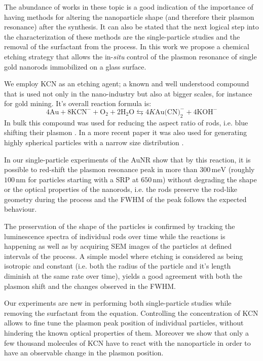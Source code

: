 \documentclass{article}
\begin{document}
The abundance of works in these topic is a good indication of the importance of
having methods for altering the nanoparticle shape (and therefore their plasmon
resonance) after the synthesis. It can also be stated that the next logical step
into the characterization of these methods are the single-particle studies and
the removal of the surfactant from the process. In this work we propose a
chemical etching strategy that allows the in-\textit{situ} control of the
plasmon resonance of single gold nanorods immobilized on a glass surface.

We employ KCN as an etching agent; a known and well understood compound that is
used not only in the nano-industry but also at bigger scales, for instance for
gold mining. It's overall reaction formula is:
\begin{equation*}
4\textrm{Au} + 8\textrm{KCN}^-+\textrm{O}_2 + 2\textrm{H}_2\textrm{O}
\leftrightarrows 4K\textrm{Au(CN)}_2^-+4\textrm{KOH}^-
\end{equation*}
In bulk this compound was used for reducing the aspect ratio of rods, i.e.
blue shifting their plasmon \cite{Jana2002}. In a more recent paper it was also
used for generating highly spherical particles with a narrow size
distribution \cite{Lee2013}. 

In our single-particle experiments of the AuNR show that by this reaction, it is
possible to red-shift the plasmon resonance peak in more than
$300\,\textrm{meV}$ (roughly $100\,\textrm{nm}$ for particles starting with a
SRP at $650\,\textrm{nm}$) without degrading the shape or the optical properties
of the nanorods, i.e. the rods preserve the rod-like geometry during the process
and the FWHM of the peak follows the expected behaviour.

The preservation of the shape of the particles is confirmed by tracking the
luminescence spectra of individual rods over time while the reactions is
happening as well as by acquiring SEM images of the particles at defined
intervals of the process. A simple model where etching is considered as being
isotropic and constant (i.e. both the radius of the particle and it's length
diminish at the same rate over time), yields a good agreement with both the
plasmon shift and the changes observed in the FWHM. 

Our experiments are new in performing both single-particle studies while
removing the surfactant from the equation. Controlling the concentration of KCN
allows to fine tune the plasmon peak position of individual particles, without
hindering the known optical properties of them. Moreover we show that only a few
thousand molecules of KCN have to react with the nanoparticle in order to have
an observable change in the plasmon position.
\end{document}
